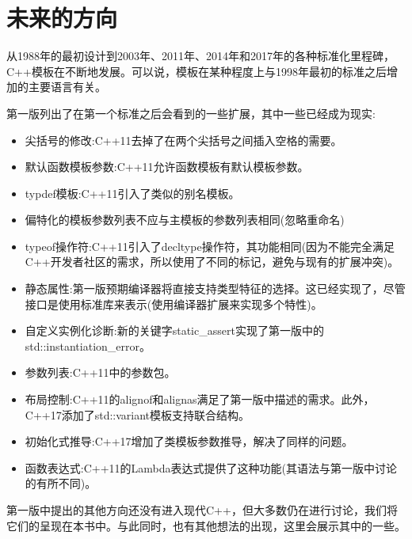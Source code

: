 \chapter{未来的方向}

从1988年的最初设计到2003年、2011年、2014年和2017年的各种标准化里程碑，C++模板在不断地发展。可以说，模板在某种程度上与1998年最初的标准之后增加的主要语言有关。

第一版列出了在第一个标准之后会看到的一些扩展，其中一些已经成为现实:

\begin{itemize}
\item 
尖括号的修改:C++11去掉了在两个尖括号之间插入空格的需要。

\item 
默认函数模板参数:C++11允许函数模板有默认模板参数。

\item 
typdef模板:C++11引入了类似的别名模板。

\item 
偏特化的模板参数列表不应与主模板的参数列表相同(忽略重命名)

\item 
typeof操作符:C++11引入了decltype操作符，其功能相同(因为不能完全满足C++开发者社区的需求，所以使用了不同的标记，避免与现有的扩展冲突)。

\item 
静态属性:第一版预期编译器将直接支持类型特征的选择。这已经实现了，尽管接口是使用标准库来表示(使用编译器扩展来实现多个特性)。

\item 
自定义实例化诊断:新的关键字static\_assert实现了第一版中的std::instantiation\_error。

\item 
参数列表:C++11中的参数包。

\item 
布局控制:C++11的alignof和alignas满足了第一版中描述的需求。此外，C++17添加了std::variant模板支持联合结构。

\item 
初始化式推导:C++17增加了类模板参数推导，解决了同样的问题。

\item 
函数表达式:C++11的Lambda表达式提供了这种功能(其语法与第一版中讨论的有所不同)。
\end{itemize}

第一版中提出的其他方向还没有进入现代C++，但大多数仍在进行讨论，我们将它们的呈现在本书中。与此同时，也有其他想法的出现，这里会展示其中的一些。














